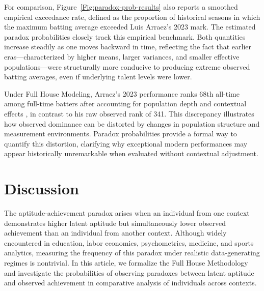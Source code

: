 \documentclass[12pt]{article}
\begin{document}
For comparison, Figure~\ref{Fig:paradox-prob-results} also reports a smoothed empirical exceedance rate, defined as the proportion of historical seasons in which the maximum batting average exceeded Luis Arraez's 2023 mark. The estimated paradox probabilities closely track this empirical benchmark. Both quantities increase steadily as one moves backward in time, reflecting the fact that earlier eras---characterized by higher means, larger variances, and smaller effective populations---were structurally more conducive to producing extreme observed batting averages, even if underlying talent levels were lower.

Under Full House Modeling, Arraez's 2023 performance ranks 68th all-time among full-time batters after accounting for population depth and contextual effects \citep{yan2025comparing, fullhouse2025}, in contrast to his raw observed rank of 341. This discrepancy illustrates how observed dominance can be distorted by changes in population structure and measurement environments. Paradox probabilities provide a formal way to quantify this distortion, clarifying why exceptional modern performances may appear historically unremarkable when evaluated without contextual adjustment.


\section{Discussion}

The aptitude-achievement paradox arises when an individual from one context demonstrates higher latent aptitude but simultaneously lower observed achievement than an individual from another context. Although widely encountered in education, labor economics, psychometrics, medicine, and sports analytics, measuring the frequency of this paradox under realistic data-generating regimes is nontrivial. In this article, we formalize the Full House Methodology and investigate the probabilities of observing paradoxes between latent aptitude and observed achievement in comparative analysis of individuals across contexts.
\end{document}
